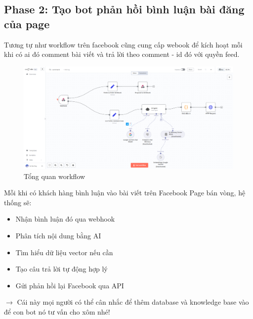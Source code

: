 \newpage
\subsection{Phase 2: Tạo bot phản hồi bình luận bài đăng của page}

Tương tự như workflow trên facebook cũng cung cấp webook để kích hoạt mỗi khi có ai đó comment bài viết và trả lời theo comment - id đó với quyền feed.

\begin{figure}[htbp]
    \centering
    \includegraphics[width=1\linewidth]{Chap1-7/fb-comment.pdf}
    \caption{Tổng quan workflow}
\end{figure}
Mỗi khi có khách hàng bình luận vào bài viết trên Facebook Page bán vòng, hệ thống sẽ:

\begin{itemize}
    \item Nhận bình luận đó qua webhook

    \item Phân tích nội dung bằng AI

    \item Tìm hiểu dữ liệu vector nếu cần

    \item Tạo câu trả lời tự động hợp lý

    \item Gửi phản hồi lại Facebook qua API
\end{itemize}

$\rightarrow$ Cái này mọi người có thể cân nhắc để thêm database và knowledge base vào để con bot nó tư vấn cho xôm nhé!




